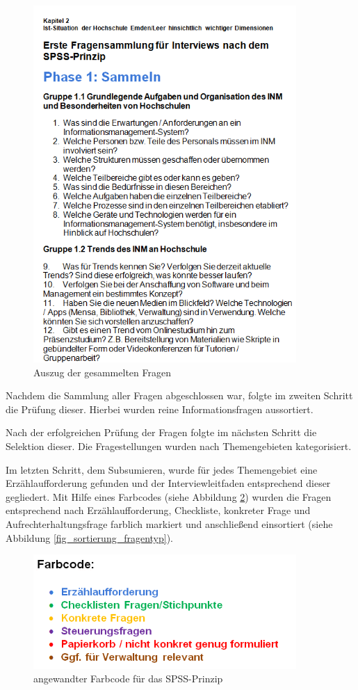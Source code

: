 \begin{figure}[h!]
	\centering
	\includegraphics[width=10cm]{kapitel/gruppe2/bilder/auszug_fragen}
	\caption{Auszug der gesammelten Fragen}
	\label{fig_auszug_fragen_sammeln}
\end{figure}

Nachdem die Sammlung aller Fragen abgeschlossen war, folgte im zweiten Schritt die Prüfung dieser. Hierbei wurden reine Informationsfragen aussortiert. 

Nach der erfolgreichen Prüfung der Fragen folgte im nächsten Schritt die Selektion dieser. Die Fragestellungen wurden nach Themengebieten kategorisiert. 

Im letzten Schritt, dem Subsumieren, wurde für jedes Themengebiet eine Erzählaufforderung gefunden und der Interviewleitfaden entsprechend dieser gegliedert. Mit Hilfe eines Farbcodes (siehe Abbildung \ref{fig_farbcode_SPSS}) wurden die Fragen entsprechend nach Erzählaufforderung, Checkliste, konkreter Frage und Aufrechterhaltungsfrage farblich markiert und anschließend einsortiert (siehe Abbildung \ref{fig_sortierung_fragentyp}).

\begin{figure}[h!]
	\centering
	\includegraphics[width=10cm]{kapitel/gruppe2/bilder/farbcode_spss}
	\caption{angewandter Farbcode für das SPSS-Prinzip}
	\label{fig_farbcode_SPSS}
\end{figure}

